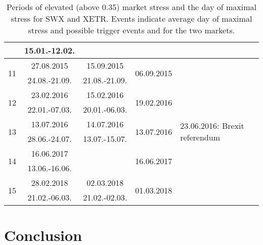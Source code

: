 \documentclass[11pt,twoside,a4paper]{article}
\numberwithin{equation}{section}
\begin{document}
\begin{table}[!ht]
\begin{tabular}{c|c|c|c|l}
							 & 15.01.-12.02.	& & &\\
\hline
\multirow{2}{*}{11} & 27.08.2015 		& 15.09.2015     & \multirow{2}{*}{06.09.2015} & \multirow{2}{0.33\linewidth}{}\\
							 & 24.08.-21.09.	& 21.08.-21.09. & &\\
\hline
\multirow{2}{*}{12} & 23.02.2016 		& 15.02.2016     & \multirow{2}{*}{19.02.2016} & \multirow{2}{0.33\linewidth}{}\\
							 & 22.01.-07.03.	& 20.01.-06.03. & &\\
\hline
\multirow{2}{*}{13} & 13.07.2016 		& 14.07.2016     & \multirow{2}{*}{13.07.2016} & \multirow{2}{0.33\linewidth}{23.06.2016: Brexit referendum}\\
							 & 28.06.-24.07.	& 13.07.-15.07. & &\\
\hline
\multirow{2}{*}{14} & 16.06.2017 		& & \multirow{2}{*}{16.06.2017} & \multirow{2}{0.33\linewidth}{}\\
							 & 13.06.-16.06.	& & &\\
\hline
\multirow{2}{*}{15} & 28.02.2018 		& 02.03.2018     & \multirow{2}{*}{01.03.2018} & \multirow{2}{0.33\linewidth}{}\\
							 & 21.02.-06.03.	& 21.02.-02.03. & &\\
\hline
\end{tabular}
\caption{Periods of elevated (above 0.35) market stress and the day of maximal stress for SWX and XETR. Events indicate average day of maximal stress and possible trigger events and  for the two markets.}
\label{tab_marketevents}
\end{table}
\FloatBarrier
\section{Conclusion}

{}

\end{document}
